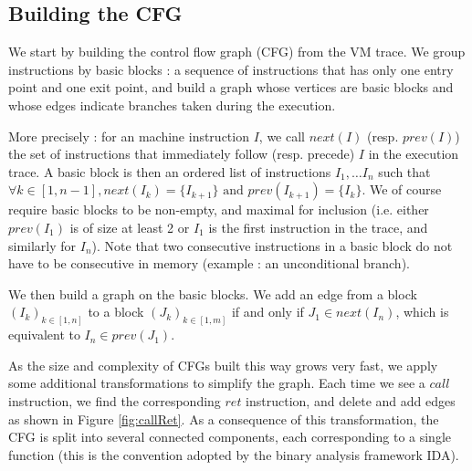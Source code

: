 \documentclass[english]{article}
\begin{document}
\subsection{Building the CFG}

We start by building the control flow graph (CFG) from the VM trace. We group instructions by basic blocks : a sequence of instructions that has only one entry point and one exit point, and build a graph whose vertices are basic blocks and whose edges indicate branches taken during the execution.

More precisely : for an machine instruction $I$, we call $next(I)$ (resp. $prev(I)$) the set of instructions that immediately follow (resp. precede) $I$ in the execution trace. A basic block is then an ordered list of instructions $I_1, \dots I_n$ such that $\forall k \in [1, n-1], next(I_k) = \{I_{k+1}\} \textrm{ and } prev(I_{k+1}) = \{I_k\}$. We of course require basic blocks to be non-empty, and maximal for inclusion (i.e. either $prev(I_1)$ is of size at least 2 or $I_1$ is the first instruction in the trace, and similarly for $I_n$). Note that two consecutive instructions in a basic block do not have to be consecutive in memory (example : an unconditional branch).

We then build a graph on the basic blocks. We add an edge from a block $(I_k)_{k \in [1,n]}$ to a block $(J_k)_{k \in [1, m]}$ if and only if $J_1 \in next(I_n)$, which is equivalent to $I_n \in prev(J_1)$.

As the size and complexity of CFGs built this way grows very fast, we apply some additional transformations to simplify the graph. Each time we see a $call$ instruction, we find the corresponding $ret$ instruction, and delete and add edges as shown in Figure \ref{fig:callRet}. As a consequence of this transformation, the CFG is split into several connected components, each corresponding to a single function (this is the convention adopted by the binary analysis framework IDA).
\end{document}

